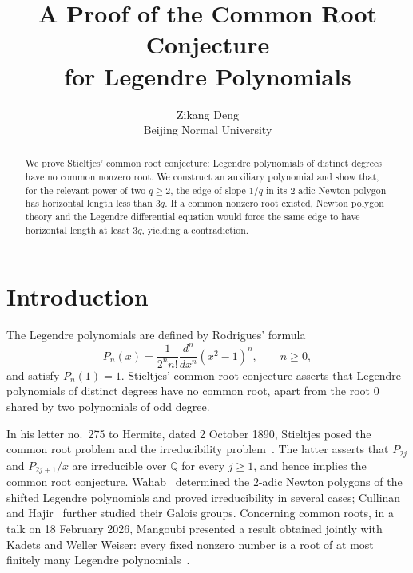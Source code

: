 \documentclass[11pt,a4paper]{article}
\title{\bfseries A Proof of the Common Root Conjecture\\for Legendre Polynomials}
\author{Zikang Deng\\[3pt]\normalsize Beijing Normal University}
\date{}
\numberwithin{equation}{section}
\theoremstyle{definition}
\begin{document}
\maketitle
\begin{abstract}
We prove Stieltjes' common root conjecture: Legendre polynomials of distinct degrees have no common nonzero root. We construct an auxiliary polynomial and show that, for the relevant power of two $q\ge2$, the edge of slope $1/q$ in its $2$-adic Newton polygon has horizontal length less than $3q$. If a common nonzero root existed, Newton polygon theory and the Legendre differential equation would force the same edge to have horizontal length at least $3q$, yielding a contradiction.
\end{abstract}

\section{Introduction}

The Legendre polynomials are defined by Rodrigues' formula
\begin{equation}\label{eq:1-1}
 P_n(x)=\frac{1}{2^n n!}\frac{d^n}{dx^n}(x^2-1)^n,
 \qquad n\ge0, 
\end{equation}
and satisfy $P_n(1)=1$. Stieltjes' common root conjecture asserts that Legendre polynomials of distinct degrees have no common root, apart from the root $0$ shared by two polynomials of odd degree.

In his letter no.~275 to Hermite, dated 2 October 1890, Stieltjes posed the common root problem and the irreducibility problem~\cite{Stieltjes,Gichev}. The latter asserts that $P_{2j}$ and $P_{2j+1}/x$ are irreducible over $\mathbb{Q}$ for every $j\ge1$, and hence implies the common root conjecture. Wahab~\cite{Wahab} determined the $2$-adic Newton polygons of the shifted Legendre polynomials and proved irreducibility in several cases; Cullinan and Hajir~\cite{CullinanHajir} further studied their Galois groups. Concerning common roots, in a talk on 18 February 2026, Mangoubi presented a result obtained jointly with Kadets and Weller Weiser: every fixed nonzero number is a root of at most finitely many Legendre polynomials~\cite{Mangoubi}.
\end{document}
